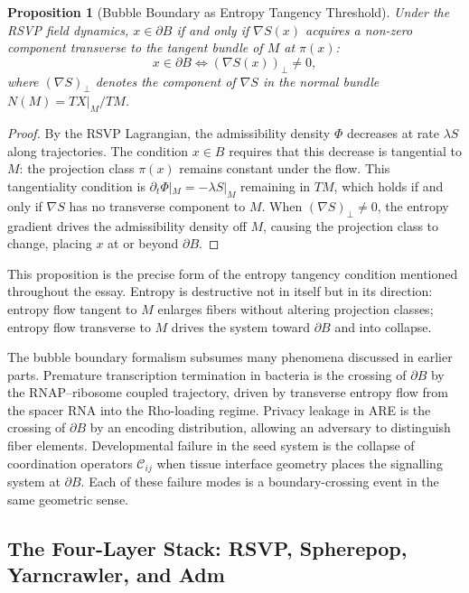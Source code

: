 \documentclass[12pt, a4paper]{article}
\theoremstyle{essaystyle}
\newtheorem{proposition}{Proposition}
\begin{document}
\begin{proposition}[Bubble Boundary as Entropy Tangency Threshold]
Under the RSVP field dynamics, $x \in \partial B$ if and only if $\nabla S(x)$ acquires
a non-zero component transverse to the tangent bundle of $M$ at $\pi(x)$:
\[
x \in \partial B \iff (\nabla S(x))_\perp \neq 0,
\]
where $(\nabla S)_\perp$ denotes the component of $\nabla S$ in the normal bundle
$N(M) = TX|_M / TM$.
\end{proposition}

\begin{proof}
By the RSVP Lagrangian, the admissibility density $\Phi$ decreases at rate
$\lambda S$ along trajectories. The condition $x \in B$ requires that this
decrease is tangential to $M$: the projection class $\pi(x)$ remains constant under
the flow. This tangentiality condition is $\partial_t \Phi|_M = -\lambda S|_M$
remaining in $TM$, which holds if and only if $\nabla S$ has no transverse component
to $M$. When $(\nabla S)_\perp \neq 0$, the entropy gradient drives the admissibility
density off $M$, causing the projection class to change, placing $x$ at or beyond
$\partial B$.
\end{proof}

This proposition is the precise form of the entropy tangency condition mentioned
throughout the essay. Entropy is destructive not in itself but in its direction:
entropy flow tangent to $M$ enlarges fibers without altering projection classes;
entropy flow transverse to $M$ drives the system toward $\partial B$ and into collapse.

The bubble boundary formalism subsumes many phenomena discussed in earlier parts.
Premature transcription termination in bacteria is the crossing of $\partial B$ by the
RNAP--ribosome coupled trajectory, driven by transverse entropy flow from the spacer
RNA into the Rho-loading regime. Privacy leakage in ARE is the crossing of $\partial B$
by an encoding distribution, allowing an adversary to distinguish fiber elements.
Developmental failure in the seed system is the collapse of coordination operators
$\mathcal{C}_{ij}$ when tissue interface geometry places the signalling system at
$\partial B$. Each of these failure modes is a boundary-crossing event in the same
geometric sense.

\subsection{The Four-Layer Stack: RSVP, Spherepop, Yarncrawler, and Adm}
\end{document}
